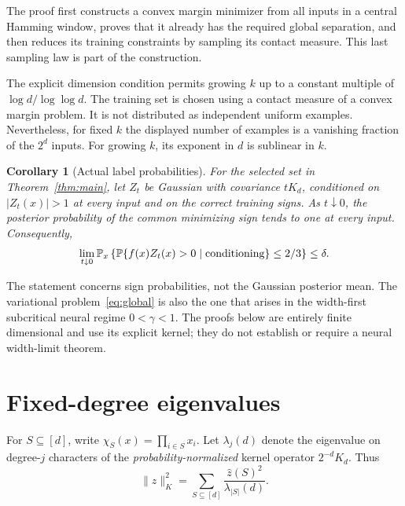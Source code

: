 \documentclass[11pt,a4paper]{article}
\newtheorem{corollary}[theorem]{Corollary}
\theoremstyle{remark}\newtheorem{remark}[theorem]{Remark}
\newcommand{\normK}[1]{\lVert #1\rVert_K}
\begin{document}
The proof first constructs a convex margin minimizer from all inputs in
a central Hamming window, proves that it already has the required global
separation, and then reduces its training constraints by sampling its
contact measure. This last sampling law is part of the construction.

The explicit dimension condition permits growing $k$ up to a constant
multiple of $\log d/\log\log d$. The training set is chosen
using a contact measure of a convex margin problem. It is not distributed
as independent uniform examples. Nevertheless, for fixed $k$ the displayed
number of examples is a vanishing fraction of the $2^d$ inputs. For growing
$k$, its exponent in $d$ is sublinear in $k$.

\begin{corollary}[Actual label probabilities]\label{cor:gp}
For the selected set in Theorem~\ref{thm:main}, let $Z_t$ be Gaussian with
covariance $tK_d$, conditioned on $|Z_t(x)|>1$ at every input and on the
correct training signs. As $t\downarrow0$, the posterior probability of
the common minimizing sign tends to one at every input. Consequently,
\[
 \lim_{t\downarrow0}\mathbb P_x\left\{
   \mathbb P\{f(x)Z_t(x)>0\mid\text{conditioning}\}\le2/3\right\}\le\delta.
\]
\end{corollary}

The statement concerns sign probabilities, not the Gaussian posterior
mean. The variational problem~\eqref{eq:global} is also the one that arises
in the width-first subcritical neural regime $0<\gamma<1$. The proofs below
are entirely finite dimensional and use its explicit kernel; they do not
establish or require a neural width-limit theorem.

\section{Fixed-degree eigenvalues}
For $S\subseteq[d]$, write $\chi_S(x)=\prod_{i\in S}x_i$. Let
$\lambda_j(d)$ denote the eigenvalue on degree-$j$ characters of the
\emph{probability-normalized} kernel operator $2^{-d}K_d$. Thus
\begin{equation}\label{eq:walshenergy}
 \normK z^2=\sum_{S\subseteq[d]}
       \frac{\widehat z(S)^2}{\lambda_{|S|}(d)}.
\end{equation}
\end{document}
